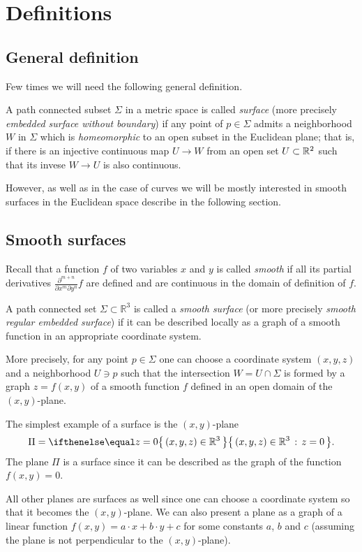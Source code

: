 \chapter{Definitions}

\section*{General definition}

Few times we will need the following general definition.

A path connected subset $\Sigma$ in a metric space is called \emph{surface} (more precisely \emph{embedded surface without boundary}) 
if any point of $p\in \Sigma$ admits a neighborhood $W$ in $\Sigma$ which is \emph{homeomorphic} to an open subset in the Euclidean plane;
that is, if there is an injective continuous map $U\to W$ from an open set $U\subset \mathbb{R}^2$ such that its invese $W\to U$ is also continuous.

However, as well as in the case of curves we will be mostly interested in smooth surfaces in the Euclidean space describe in the following section.

\section*{Smooth surfaces}

Recall that a function $f$ of two variables $x$ and $y$ is called \emph{smooth} if all its partial derivatives $\frac{\partial^{m+n}}{\partial x^m\partial y^n}f$ are defined and are continuous in the domain of definition of $f$. 

A path connected set $\Sigma \subset \mathbb{R}^3$ is called a \emph{smooth surface} (or more precisely \emph{smooth regular embedded surface}) if it can be described locally as a graph of a smooth function in an appropriate coordinate system.\label{page:def-smooth-surface}

More precisely, for any point $p\in \Sigma$ one can choose a coordinate system $(x,y,z)$ and a neighborhood $U\ni p$ such that
the intersection $W=U\cap \Sigma$ is formed by a graph $z=f(x,y)$ of a smooth function $f$ defined in an open domain of the $(x,y)$-plane.

The simplest example of a surface is the $(x,y)$-plane 
\[\Pi=\set{(x,y,z)\in\RR^3}{z=0}.\]
The plane $\Pi$ is a surface since
it can be described as the graph of the function $f(x,y)=0$.

All other planes are surfaces as well since one can choose a coordinate system so that it becomes the $(x,y)$-plane.
We can also present a plane as a graph of a linear function 
$f(x,y)=a\cdot x+b\cdot y+c$ for some constants $a$, $b$ and $c$
(assuming the plane is not perpendicular to the $(x,y)$-plane).

